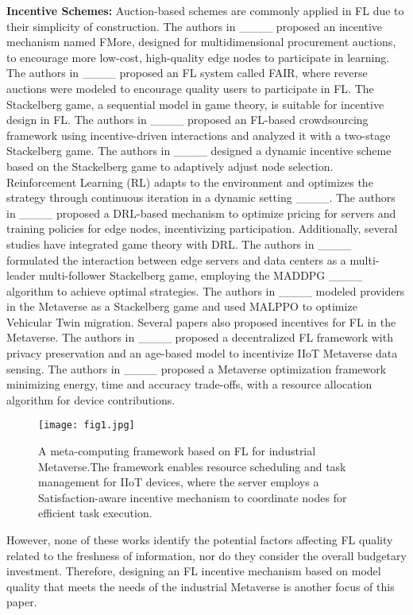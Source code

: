 \textbf{Incentive Schemes:} Auction-based schemes are commonly applied in FL due to their simplicity of construction. The authors in ____ proposed an incentive mechanism named FMore, designed for multidimensional procurement auctions, to encourage more low-cost, high-quality edge nodes to participate in learning. The authors in ____ proposed an FL system called FAIR, where reverse auctions were modeled to encourage quality users to participate in FL. The Stackelberg game, a sequential model in game theory, is suitable for incentive design in FL. The authors in ____ proposed an FL-based crowdsourcing framework using incentive-driven interactions and analyzed it with a two-stage Stackelberg game. The authors in ____ designed a dynamic incentive scheme based on the Stackelberg game to adaptively adjust node selection. Reinforcement Learning (RL) adapts to the environment and optimizes the strategy through continuous iteration in a dynamic setting ____. The authors in ____ proposed a DRL-based mechanism to optimize pricing for servers and training policies for edge nodes, incentivizing participation. Additionally, several studies have integrated game theory with DRL. The authors in ____ formulated the interaction between edge servers and data centers as a multi-leader multi-follower Stackelberg game, employing the MADDPG ____ algorithm to achieve optimal strategies. The authors in ____ modeled providers in the Metaverse as a Stackelberg game and used MALPPO to optimize Vehicular Twin migration. Several papers also proposed incentives for FL in the Metaverse. The authors in ____ proposed a decentralized FL framework with privacy preservation and an age-based model to incentivize IIoT Metaverse data sensing. The authors in ____ proposed a Metaverse optimization framework minimizing energy, time and accuracy trade-offs, with a resource allocation algorithm for device contributions.

 \begin{figure*}[!t]
	\centerline{\texttt{[image: fig1.jpg]}}
	\caption{A meta-computing framework based on FL for industrial Metaverse.The framework enables resource scheduling and task management for IIoT devices, where the server employs a Satisfaction-aware incentive mechanism to coordinate nodes for efficient task execution.}
	\label{fig1}
\end{figure*}

However, none of these works identify the potential factors affecting FL quality related to the freshness of information, nor do they consider the overall budgetary investment. Therefore, designing an FL incentive mechanism based on model quality that meets the needs of the industrial Metaverse is another focus of this paper.
